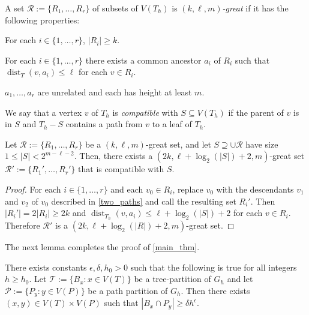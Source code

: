 \documentclass{patmorin}
\newcommand{\defin}[1]{\emph{\color{brightmaroon}#1}}
\DeclareMathOperator{\dist}{dist}
\renewcommand{\le}{\leqslant}
\renewcommand{\ge}{\geqslant}
\begin{document}
A set $\mathcal{R}:=\{R_1,\ldots,R_r\}$ of subsets of $V(T_h)$ is \defin{$(k,\ell,m)$-great} if it has the following properties:

\begin{compactenum}
  \item For each $i\in\{1,\ldots,r\}$, $|R_i|\ge k$.
  \item For each $i\in\{1,\ldots,r\}$ there exists a common ancestor $a_i$ of $R_i$ such that $\dist_T(v,a_i)\le\ell$ for each $v\in R_i$.
  \item $a_1,\ldots,a_r$ are unrelated and each has height at least $m$.
\end{compactenum}

We say that a vertex $v$ of $T_h$ is \defin{compatible} with $S\subseteq V(T_h)$ if the parent of $v$ is in $S$ and $T_h-S$ contains a path from $v$ to a leaf of $T_h$.


\begin{lem}\label{compatible_set}
  Let $\mathcal{R}:=\{R_1,\ldots,R_r\}$ be a $(k,\ell,m)$-great set,  and let $S\supseteq \cup\mathcal{R}$ have size $1\le |S|< 2^{m-\ell-2}$.  Then, there exists a $(2k,\ell + \log_2(|S|)+2,m)$-great set $\mathcal{R}':=\{R_1',\ldots,R_r'\}$ that is compatible with $S$.
\end{lem}

\begin{proof}
  For each $i\in\{1,\ldots,r\}$ and each $v_0\in R_i$, replace $v_0$ with the descendants $v_1$ and $v_2$ of $v_0$ described in \cref{two_paths} and call the resulting set $R_i'$.   Then $|R_i'|=2|R_i|\ge 2k$ and $\dist_{T_h}(v,a_i)\le \ell+\log_2(|S|)+2$ for each $v\in R_i$.  Therefore $\mathcal{R}'$ is a $(2k,\ell + \log_2(|R|)+2,m)$-great set.
\end{proof}

The next lemma completes the proof of \cref{main_thm}.
\begin{lem}\label{big_lemma}
  There exists constants $\epsilon,\delta, h_0 >0$ such that the following is true for all integers $h\ge h_0$. Let $\mathcal{T}:=\{B_x:x\in V(T)\}$ be a tree-partition of $G_h$ and let $\mathcal{P}:=\{P_y:y\in V(P)\}$ be a path partition of $G_h$.  Then there exists $(x,y)\in V(T)\times V(P)$ such that $|B_x\cap P_y| \ge \delta h^\epsilon$.
\end{lem}
\end{document}
